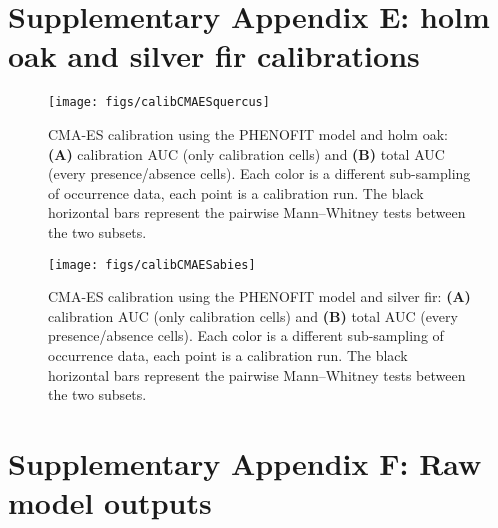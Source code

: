\documentclass[11pt,]{article}
\begin{document}
\newpage

\hypertarget{appendixE}{%
\section{Supplementary Appendix E: holm oak and silver fir
calibrations}\label{appendixE}}

\renewcommand*\thetable{E.\arabic{table}}
\renewcommand*\thefigure{E.\arabic{figure}}

\setcounter{figure}{0}
\setcounter{table}{0}

\renewcommand*{\thepage}{E--\arabic{page}}

\hfill \break

\begin{figure}[H]

{\centering \texttt{[image: figs/calibCMAESquercus]} 

}

\caption{CMA-ES calibration using the PHENOFIT model and holm oak: \textbf{(A)} calibration AUC (only calibration cells) and \textbf{(B)} total AUC (every presence/absence cells). Each color is a different sub-sampling of occurrence data, each point is a calibration run. The black horizontal bars represent the pairwise Mann–Whitney tests between the two subsets.}\label{fig:calibCMAESquercus}
\end{figure}

\begin{figure}[H]

{\centering \texttt{[image: figs/calibCMAESabies]} 

}

\caption{CMA-ES calibration using the PHENOFIT model and silver fir: \textbf{(A)} calibration AUC (only calibration cells) and \textbf{(B)} total AUC (every presence/absence cells). Each color is a different sub-sampling of occurrence data, each point is a calibration run. The black horizontal bars represent the pairwise Mann–Whitney tests between the two subsets.}\label{fig:calibCMAESabies}
\end{figure}

\newpage

\hypertarget{appendixF}{%
\section{Supplementary Appendix F: Raw model outputs}\label{appendixF}}

\renewcommand*\thetable{F.\arabic{table}}
\renewcommand*\thefigure{F.\arabic{figure}}
\end{document}
